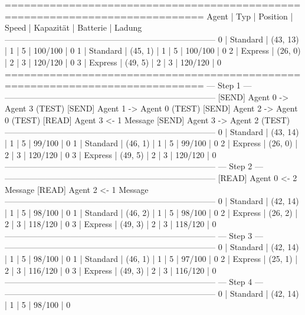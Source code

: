 =============================================================================
 Agent | Typ       | Position    | Speed   | Kapazität  | Batterie  | Ladung
-----------------------------------------------------------------------------
 0     | Standard  | (43, 13)    | 1       | 5          | 100/100   | 0
 1     | Standard  | (45, 1)     | 1       | 5          | 100/100   | 0
 2     | Express   | (26, 0)     | 2       | 3          | 120/120   | 0
 3     | Express   | (49, 5)     | 2       | 3          | 120/120   | 0
=============================================================================
                                --- Step 1 ---
-----------------------------------------------------------------------------
[SEND]    Agent 0 -> Agent 3 (TEST)
[SEND]    Agent 1 -> Agent 0 (TEST)
[SEND]    Agent 2 -> Agent 0 (TEST)
[READ]    Agent 3 <- 1 Message
[SEND]    Agent 3 -> Agent 2 (TEST)
-----------------------------------------------------------------------------
 0     | Standard  | (43, 14)    | 1       | 5          | 99/100    | 0
 1     | Standard  | (46, 1)     | 1       | 5          | 99/100    | 0
 2     | Express   | (26, 0)     | 2       | 3          | 120/120   | 0
 3     | Express   | (49, 5)     | 2       | 3          | 120/120   | 0
-----------------------------------------------------------------------------
                                --- Step 2 ---
-----------------------------------------------------------------------------
[READ]    Agent 0 <- 2 Message
[READ]    Agent 2 <- 1 Message
-----------------------------------------------------------------------------
 0     | Standard  | (42, 14)    | 1       | 5          | 98/100    | 0
 1     | Standard  | (46, 2)     | 1       | 5          | 98/100    | 0
 2     | Express   | (26, 2)     | 2       | 3          | 118/120   | 0
 3     | Express   | (49, 3)     | 2       | 3          | 118/120   | 0
-----------------------------------------------------------------------------
                                --- Step 3 ---
-----------------------------------------------------------------------------
 0     | Standard  | (42, 14)    | 1       | 5          | 98/100    | 0
 1     | Standard  | (46, 1)     | 1       | 5          | 97/100    | 0
 2     | Express   | (25, 1)     | 2       | 3          | 116/120   | 0
 3     | Express   | (49, 3)     | 2       | 3          | 116/120   | 0
-----------------------------------------------------------------------------
                                --- Step 4 ---
-----------------------------------------------------------------------------
 0     | Standard  | (42, 14)    | 1       | 5          | 98/100    | 0
